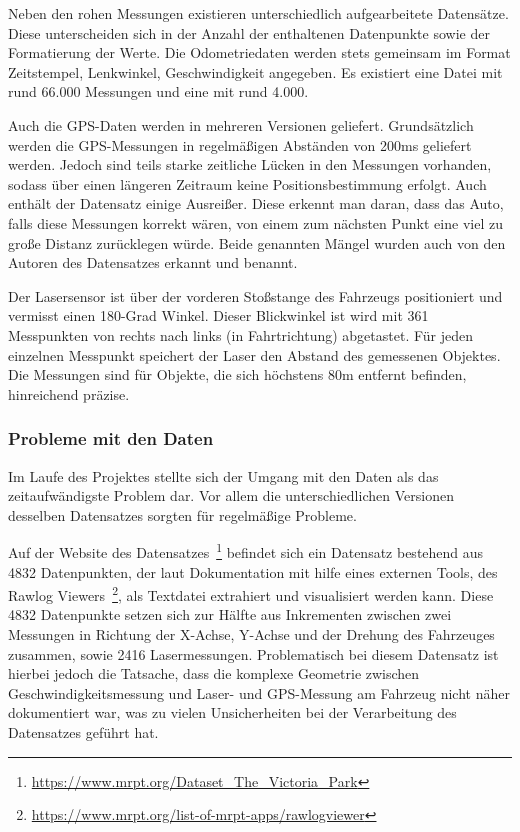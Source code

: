 \documentclass[11pt]{scrartcl}
\begin{document}
Neben den rohen Messungen existieren unterschiedlich aufgearbeitete Datensätze. Diese unterscheiden sich in der Anzahl der enthaltenen Datenpunkte sowie der Formatierung der Werte. Die Odometriedaten werden stets gemeinsam im Format {Zeitstempel, Lenkwinkel, Geschwindigkeit} angegeben. Es existiert eine Datei mit rund 66.000 Messungen und eine mit rund 4.000.

Auch die GPS-Daten werden in mehreren Versionen geliefert. Grundsätzlich werden die GPS-Messungen in regelmäßigen Abständen von 200ms geliefert werden. Jedoch sind teils starke zeitliche Lücken in den Messungen vorhanden, sodass über einen längeren Zeitraum keine Positionsbestimmung erfolgt. Auch enthält der Datensatz einige Ausreißer. Diese erkennt man daran, dass das Auto, falls diese Messungen korrekt wären, von einem zum nächsten Punkt eine viel zu große Distanz zurücklegen würde. Beide genannten Mängel wurden auch von den Autoren des Datensatzes erkannt und benannt.

Der Lasersensor ist über der vorderen Stoßstange des Fahrzeugs positioniert und vermisst einen 180-Grad Winkel. Dieser Blickwinkel ist wird mit 361 Messpunkten von rechts nach links (in Fahrtrichtung) abgetastet. Für jeden einzelnen Messpunkt speichert der Laser den Abstand des gemessenen Objektes. Die Messungen sind für Objekte, die sich höchstens 80m entfernt befinden, hinreichend präzise. 

\subsubsection{Probleme mit den Daten}
Im Laufe des Projektes stellte sich der Umgang mit den Daten als das zeitaufwändigste Problem dar. Vor allem die unterschiedlichen Versionen desselben Datensatzes sorgten für regelmäßige Probleme.

Auf der Website des Datensatzes~\footnote{\url{https://www.mrpt.org/Dataset_The_Victoria_Park}} befindet sich ein Datensatz bestehend aus 4832 Datenpunkten, der laut Dokumentation mit hilfe eines externen Tools, des Rawlog Viewers~\footnote{\url{https://www.mrpt.org/list-of-mrpt-apps/rawlogviewer}}, als Textdatei extrahiert und visualisiert werden kann. Diese 4832 Datenpunkte setzen sich zur Hälfte aus Inkrementen zwischen zwei Messungen in Richtung der X-Achse, Y-Achse und der Drehung des Fahrzeuges zusammen, sowie 2416 Lasermessungen. Problematisch bei diesem Datensatz ist hierbei jedoch die Tatsache, dass die komplexe Geometrie zwischen Geschwindigkeitsmessung und Laser- und GPS-Messung am Fahrzeug nicht näher dokumentiert war, was zu vielen Unsicherheiten bei der Verarbeitung des Datensatzes geführt hat. 
\end{document}
